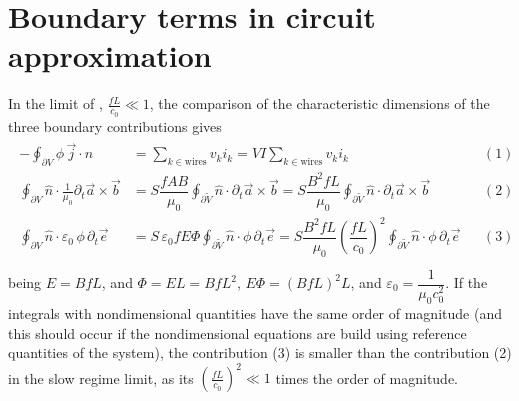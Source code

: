 \documentclass[letterpaper,10pt,english]{jupyterBook}
\begin{document}
\section{Boundary terms in circuit approximation}
\label{\detokenize{ch/circuits-energy:boundary-terms-in-circuit-approximation}}\label{\detokenize{ch/circuits-energy:classical-electromagnetism-circuits-energy-boundary}}
\sphinxAtStartPar
In the limit of {\hyperref[\detokenize{ch/regimes-slow:classical-electromagnetism-regimes-slow}]{}}, \(\frac{f L}{c_0} \ll 1\), the comparison of the characteristic dimensions of the three boundary contributions gives
\begin{equation*}
\begin{split}\begin{aligned}
  - \oint_{\partial V} \phi \, \vec{j} \cdot \hat{n} & = \sum_{k \in \text{wires}} v_k i_k = V I \sum_{k \in \text{wires}} v_k i_k && (1) \\
  \oint_{\partial V} \hat{n} \cdot \frac{1}{\mu_0} \partial_t \vec{a} \times \vec{b} & = S \dfrac{ f A B }{\mu_0} \oint_{\partial \widetilde{V}} \hat{n} \cdot \partial_t \vec{a} \times \vec{b} = S \dfrac{B^2 f L}{\mu_0}  \oint_{\partial \widetilde{V}} \hat{n} \cdot \partial_t \vec{a} \times \vec{b}  && (2) \\
  \oint_{\partial V} \hat{n} \cdot \varepsilon_0 \, \phi\, \partial_t \vec{e} & = S \, \varepsilon_0 f E \Phi \oint_{\partial \widetilde{V}} \hat{n} \cdot \phi\, \partial_t \vec{e} = S \dfrac{B^2 f L}{\mu_0} \left( \dfrac{f L}{c_0} \right)^2 \oint_{\partial \widetilde{V}} \hat{n} \cdot \phi\, \partial_t \vec{e} && (3) \\
\end{aligned}\end{split}
\end{equation*}
\sphinxAtStartPar
being \(E = B f L\), and \(\Phi = E L = B f L^2\), \(E \Phi = (B f L)^2 L\), and \(\varepsilon_0 = \dfrac{1}{\mu_0 c_0^2}\). If the integrals with non\sphinxhyphen{}dimensional quantities have the same order of magnitude (and this should occur if the non\sphinxhyphen{}dimensional equations are build using reference quantities of the system), the contribution (3) is smaller than the contribution (2) in the slow regime limit, as its \(\left( \frac{f L}{c_0} \right)^2 \ll 1\) times the order of magnitude.
\end{document}
